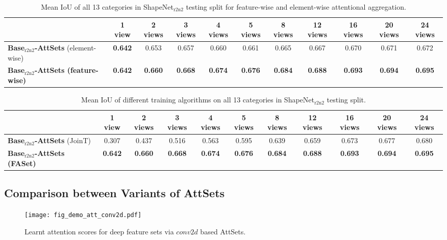 \documentclass[twocolumn]{svjour3}    \pdfoutput=1
\newcommand{\nickname}{AttSets}
\newcommand{\faset}{FASet}
\begin{document}
\begin{table*}[t]
\caption{ \small{Mean IoU of all 13 categories in ShapeNet$_{\textrm{r2n2}}$ testing split for feature-wise and element-wise attentional aggregation.}}
\centering
\label{tab:iou_fw_ew}
\tabcolsep=0.078cm
\begin{tabular}{ l|cccccccccc}
\hline
&1 view&2 views&3 views& 4 views&5 views&8 views&12 views&16 views&20 views&24 views \\
\hline
\textbf{Base$_{\textrm{r2n2}}$-\nickname{}} \scriptsize{(element-wise)} &\textbf{0.642}&0.653&0.657&0.660&0.661&0.665&0.667&0.670&0.671&0.672\\
\textbf{Base$_{\textrm{r2n2}}$-\nickname{} \scriptsize{(feature-wise)}} &\textbf{0.642}&\textbf{0.660}&\textbf{0.668}&\textbf{0.674}&\textbf{0.676}&\textbf{0.684}
&\textbf{0.688}&\textbf{0.693}&\textbf{0.694}&\textbf{0.695} \\
\hline
\end{tabular}
\vspace{-0.1cm}
\end{table*}

\begin{table*}[t]
\caption{ \small{Mean IoU of different training algorithms on all 13 categories in ShapeNet$_{\textrm{r2n2}}$ testing split.}}
\centering
\label{tab:iou_train_alg}
\tabcolsep=0.11cm
\begin{tabular}{ l|cccccccccc}
\hline
&1 view&2 views&3 views& 4 views&5 views&8 views&12 views&16 views&20 views&24 views \\
\hline
\textbf{Base$_{\textrm{r2n2}}$-\nickname{}} (JoinT)&0.307&0.437&0.516&0.563&0.595&0.639&0.659&0.673&0.677&0.680\\
\textbf{Base$_{\textrm{r2n2}}$-\nickname{} (\faset{})} &\textbf{0.642}&\textbf{0.660}&\textbf{0.668}&\textbf{0.674}&\textbf{0.676}&\textbf{0.684}
&\textbf{0.688}&\textbf{0.693}&\textbf{0.694}&\textbf{0.695} \\
\hline
\end{tabular}
\vspace{-0.3cm}
\end{table*}

\vspace{-0.45cm}
\subsection{Comparison between Variants of \nickname{}}\label{sec:variants}
\begin{figure}\vspace{-0.15cm}
\centering
   \texttt{[image: fig\_demo\_att\_conv2d.pdf]}
\caption{Learnt attention scores for deep feature sets via $conv2d$ based \nickname{}.}
\label{fig:atts_w}
\vspace{-0.35cm}
\end{figure}
\end{document}
